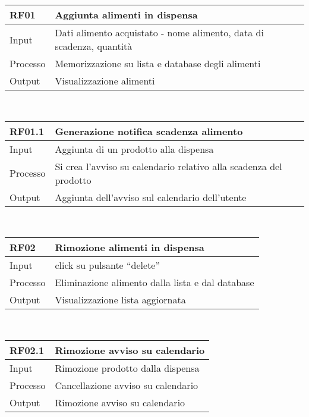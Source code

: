 \documentclass[
]{article}
\begin{document}
\begin{longtable}[]{@{}ll@{}}
\toprule\noalign{}
RF01 & Aggiunta alimenti in dispensa \\
\midrule\noalign{}
\endhead
\bottomrule\noalign{}
\endlastfoot
Input & Dati alimento acquistato - nome alimento, data di scadenza,
quantità \\
Processo & Memorizzazione su lista e database degli alimenti \\
Output & Visualizzazione alimenti \\
\end{longtable}

~

\begin{longtable}[]{@{}ll@{}}
\toprule\noalign{}
RF01.1 & Generazione notifica scadenza alimento \\
\midrule\noalign{}
\endhead
\bottomrule\noalign{}
\endlastfoot
Input & Aggiunta di un prodotto alla dispensa \\
Processo & Si crea l'avviso su calendario relativo alla scadenza del
prodotto \\
Output & Aggiunta dell'avviso sul calendario dell'utente \\
\end{longtable}

~

\begin{longtable}[]{@{}ll@{}}
\toprule\noalign{}
RF02 & Rimozione alimenti in dispensa \\
\midrule\noalign{}
\endhead
\bottomrule\noalign{}
\endlastfoot
Input & click su pulsante ``delete'' \\
Processo & Eliminazione alimento dalla lista e dal database \\
Output & Visualizzazione lista aggiornata \\
\end{longtable}

~

\begin{longtable}[]{@{}ll@{}}
\toprule\noalign{}
RF02.1 & Rimozione avviso su calendario \\
\midrule\noalign{}
\endhead
\bottomrule\noalign{}
\endlastfoot
Input & Rimozione prodotto dalla dispensa \\
Processo & Cancellazione avviso su calendario \\
Output & Rimozione avviso su calendario \\
\end{longtable}

~
\end{document}
